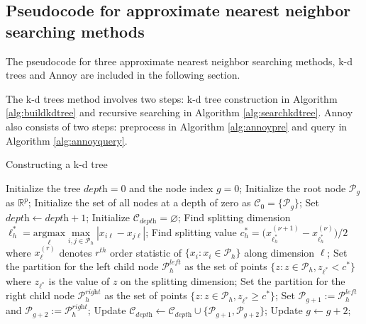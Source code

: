 \documentclass{article}
\begin{document}
\clearpage
\FloatBarrier

\subsection{Pseudocode for approximate nearest neighbor searching methods}
\label{sec:annalg}
The pseudocode for three approximate nearest neighbor searching methods, k-d trees and Annoy are included in the following section.

The k-d trees method involves two steps: k-d tree construction in Algorithm \ref{alg:buildkdtree} and recursive searching in Algorithm \ref{alg:searchkdtree}.
Annoy also consists of two steps: preprocess in Algorithm \ref{alg:annoypre} and query in Algorithm \ref{alg:annoyquery}.

\begin{algorithm}[!htb]
  \caption{Constructing a k-d tree}
  \label{alg:buildkdtree}
  \begin{algorithmic}[1]
    \STATE Initialize the tree $\textit{depth}=0$ and the node index $g=0$;
    \STATE Initialize the root node $\mathcal{P}_g$ as $\mathbb{R}^p$;
    \STATE Initialize the set of all nodes at a depth of zero as $\mathcal{C}_0=\{\mathcal{P}_g\}$;
      \STATE Set $\textit{depth}\leftarrow \textit{depth}+1$;
      \STATE Initialize $\mathcal{C}_{\textit{depth}}=\varnothing$;
        \STATE Find splitting dimension $\ell_h^*=\underset{\ell}{\textrm{argmax}}\underset{i,j\in\mathcal{P}_h}{\max}|x_{i\ell}-x_{j\ell}|$;
        \STATE Find splitting value $c_h^*=\big(x^{(\nu+1)}_{{\ell_h^*}}-x^{(\nu)}_{{\ell_h^*}}\big)/2$ where $x^{(r)}_{\ell}$ denotes $r^{th}$ order statistic of $\{x_i:x_{i}\in\mathcal{P}_h\}$ along dimension $\ell$;
        \STATE Set the partition for the left child node $\mathcal{P}^{\textit{left}}_h$ as the set of points $\{z:z\in\mathcal{P}_h, z_{\ell^*}<c^*\}$ where $z_{\ell^*}$ is the value of $z$ on the splitting dimension;
        \STATE Set the partition for the right child node $\mathcal{P}^{\textit{right}}_h$ as the set of points $\{z:z\in\mathcal{P}_h, z_{\ell^*}\geq c^*\}$;
        \STATE Set $\mathcal{P}_{g+1}:=\mathcal{P}_h^{\textit{left}}$ and $\mathcal{P}_{g+2}:=\mathcal{P}_h^{\textit{right}}$;
        \STATE Update $\mathcal{C}_{\textit{depth}}\leftarrow\mathcal{C}_{\textit{depth}}\cup\{\mathcal{P}_{g+1},\mathcal{P}_{g+2}\}$;
        \STATE Update $g\leftarrow g+2$;
      \ENDFOR
    \ENDWHILE
  \end{algorithmic}
\end{algorithm}
\end{document}
